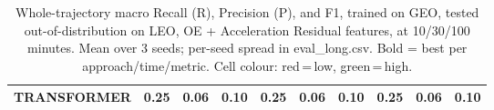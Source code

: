 \begin{table}[t]
{\begin{tabular}{l ccc ccc ccc}
\textbf{TRANSFORMER} & \cellcolor[HTML]{FF6B6B}0.25 & \cellcolor[HTML]{FF6B6B}0.06 & \cellcolor[HTML]{FF6B6B}0.10 & \cellcolor[HTML]{FF6B6B}0.25 & \cellcolor[HTML]{FF6B6B}0.06 & \cellcolor[HTML]{FF6B6B}0.10 & \cellcolor[HTML]{FF6B6B}0.25 & \cellcolor[HTML]{FF6B6B}0.06 & \cellcolor[HTML]{FF6B6B}0.10 \\
\bottomrule
\end{tabular}%
}
\caption{Whole-trajectory macro Recall (R), Precision (P), and F1, trained on GEO, tested out-of-distribution on LEO, OE + Acceleration Residual features, at 10/30/100 minutes. Mean over 3 seeds; per-seed spread in eval\_long.csv. Bold = best per approach/time/metric. Cell colour: red\,=\,low, green\,=\,high.}
\label{tab:total_geo_to_leo_ladder}
\end{table}
